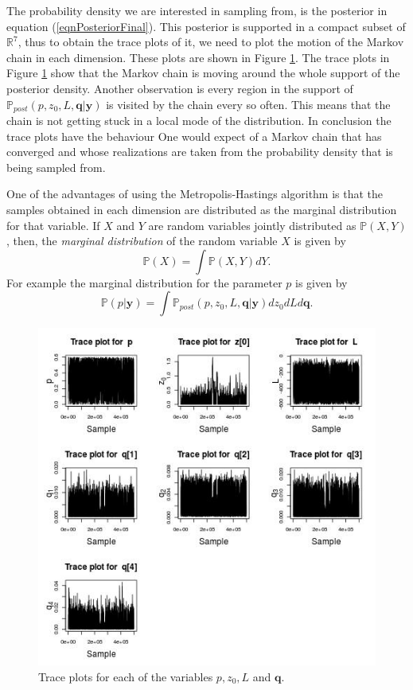\documentclass[12pt]{book}
\newcommand{\post}{\mathbb{P}_{post}}
\newcommand{\p}{\mathbb{P}}
\newcommand{\q}{\textbf{q}}
\newcommand{\pars}{p,z_{0},L}
\newcommand{\y}{\textbf{y}}
\begin{document}
The probability density we are interested in sampling from, is the  posterior in equation (\ref{eqnPosteriorFinal}). 
This posterior is supported in a compact subset of $\mathbb{R}^{7}$, thus to obtain the trace plots
of it, we need to plot the motion of the Markov chain in each dimension. These plots
are shown in Figure \ref{figTraces}. The trace plots in Figure \ref{figTraces} show that the Markov chain is moving around the whole 
support of the posterior density. Another observation is every region in the support
of $\post(\pars,\q|\y)$ is visited by the chain every so often. This means
that the chain is not getting stuck in a local mode of the distribution. In conclusion the 
trace plots have the behaviour One would expect of a Markov chain that has converged
and whose realizations are taken from the probability density that is being sampled from. 

One of the advantages of using the Metropolis-Hastings algorithm is that the samples
obtained in each dimension are distributed as the marginal distribution
for that variable. If $X$ and $Y$ are random variables jointly distributed 
as $\p(X,Y)$, then,
the \textit{marginal distribution} of the random variable $X$ is given by
\begin{equation*}
\p(X)=\int\p(X,Y)dY.
\end{equation*}
For example the marginal distribution for the parameter $p$ is given by
\begin{equation*}
\p(p|\y)=\int\post(\pars,\q|\y)dz_{0}dLd\q.
\end{equation*}

\begin{figure}[H]
\centering
\includegraphics[scale=0.7]{./FigChap4/traces}
\caption{Trace plots for each of the  variables $\pars$ and $\q$.}
\label{figTraces}
\end{figure}
\end{document}
